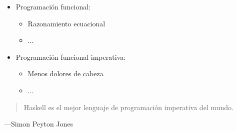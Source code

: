 \documentclass[spanish]{beamer}
\begin{document}

\begin{frame}
  \begin{itemize}
  \item Programación funcional:
    \begin{itemize}
    \item Razonamiento ecuacional
    \item ...
    \end{itemize}
  \item Programación funcional imperativa:
    \begin{itemize}
    \item Menos dolores de cabeza
    \item ...
    \end{itemize}
  \end{itemize}
\end{frame}


\begin{frame}
  \begin{quote}
    Haskell es el mejor lenguaje de programación imperativa del mundo.
  \end{quote}
  \hfill---Simon Peyton Jones
\end{frame}

\end{document}
